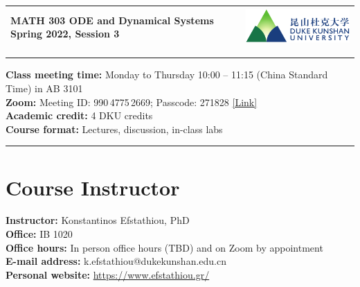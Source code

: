 \documentclass[11pt]{article}
\begin{document}

\begin{tabularx}{\textwidth}{Xm{6cm}}
\arrayrulecolor{dku-blue}\toprule\vspace{6pt}
{\bfseries\color{dku-blue}
 {\Large MATH 303} \newline\newline
 {\huge ODE and Dynamical Systems} \newline\newline
 {\Large Spring 2022, Session 3}} 
& \includegraphics[width=6cm]{dku-logo} \\
\bottomrule
\end{tabularx}

\vspace{1em}

\textcolor{dku-blue}{\rule{\textwidth}{1pt}}

\textbf{Class meeting time:} Monday to Thursday 10:00 -- 11:15 (China Standard Time) in AB 3101 \\
\textbf{Zoom:} Meeting ID: 990\,4775\,2669; Passcode: 271828 \href{https://duke.zoom.us/j/99047752669?pwd=VkptQTNXSmhKYy9hNWh1Z2oxRENsdz09}{[Link]} \\
\textbf{Academic credit:} 4 DKU credits \\
\textbf{Course format:} Lectures, discussion, in-class labs

\vspace{-1em}\textcolor{dku-blue}{\rule{\textwidth}{1pt}}


\section{Course Instructor}

\textbf{Instructor:} Konstantinos Efstathiou, PhD \\
\textbf{Office:} IB 1020 \\
\textbf{Office hours:} In person office hours (TBD) and on Zoom by appointment \\
\textbf{E-mail address:} k.efstathiou@dukekunshan.edu.cn \\
\textbf{Personal website:} \url{https://www.efstathiou.gr/}
\end{document}
